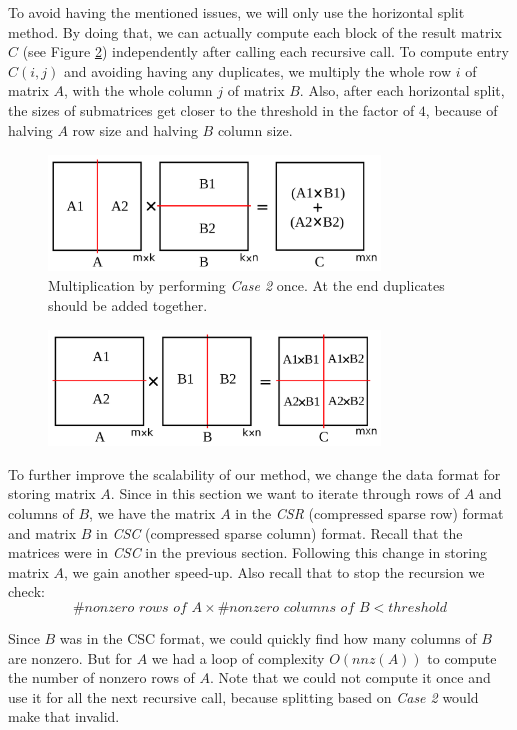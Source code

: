 To avoid having the mentioned issues, we will only use the horizontal split method. By doing that, we can actually compute each block of the result matrix $C$ (see Figure \ref{fig:skinny2}) independently after calling each recursive call. To compute entry $C(i,j)$ and avoiding having any duplicates, we multiply the whole row $i$ of matrix $A$, with the whole column $j$ of matrix $B$. Also, after each horizontal split, the sizes of submatrices get closer to the threshold in the factor of $4$, because of halving $A$ row size and halving $B$ column size.

\begin{figure}[thb]
    \includegraphics[width=8.8cm,height=3.1cm]{./figures/skinny001.pdf}
    \caption{Multiplication by performing \textit{Case 2} once. At the end duplicates should be added together.}
    \label{fig:skinny1}
\end{figure}

\begin{figure}[thb]
    \includegraphics[width=8.8cm,height=3.1cm]{./figures/skinny002.pdf}
    \caption{}
    \label{fig:skinny2}
\end{figure}


To further improve the scalability of our method, we change the data format for storing matrix $A$. Since in this section we want to iterate through rows of $A$ and columns of $B$, we have the matrix $A$ in the \textit{CSR} (compressed sparse row) format and matrix $B$ in \textit{CSC} (compressed sparse column) format. Recall that the matrices were in \textit{CSC} in the previous section. Following this change in storing matrix $A$, we gain another speed-up. Also recall that to stop the recursion we check:
\begin{equation*}
  \textit{\#nonzero rows of A} \times \textit{\#nonzero columns of B} < threshold 
\end{equation*}

Since $B$ was in the CSC format, we could quickly find how many columns of $B$ are nonzero. But for $A$ we had a loop of complexity $O(nnz(A))$ to compute the number of nonzero rows of $A$. Note that we could not compute it once and use it for all the next recursive call, because splitting based on \textit{Case 2} would make that invalid.
